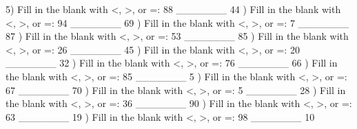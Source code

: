 \documentclass{article}%
\begin{document}
5) Fill in the blank with <, >, or =: 88 \_\_\_\_\_\_\_ 44%
\newline%
\newline%
) Fill in the blank with <, >, or =: 94 \_\_\_\_\_\_\_ 69%
\newline%
\newline%
) Fill in the blank with <, >, or =: 7 \_\_\_\_\_\_\_ 87%
\newline%
\newline%
) Fill in the blank with <, >, or =: 53 \_\_\_\_\_\_\_ 85%
\newline%
\newline%
) Fill in the blank with <, >, or =: 26 \_\_\_\_\_\_\_ 45%
\newline%
\newline%
) Fill in the blank with <, >, or =: 20 \_\_\_\_\_\_\_ 32%
\newline%
\newline%
) Fill in the blank with <, >, or =: 76 \_\_\_\_\_\_\_ 66%
\newline%
\newline%
) Fill in the blank with <, >, or =: 85 \_\_\_\_\_\_\_ 5%
\newline%
\newline%
) Fill in the blank with <, >, or =: 67 \_\_\_\_\_\_\_ 70%
\newline%
\newline%
) Fill in the blank with <, >, or =: 5 \_\_\_\_\_\_\_ 28%
\newline%
\newline%
) Fill in the blank with <, >, or =: 36 \_\_\_\_\_\_\_ 90%
\newline%
\newline%
) Fill in the blank with <, >, or =: 63 \_\_\_\_\_\_\_ 19%
\newline%
\newline%
) Fill in the blank with <, >, or =: 98 \_\_\_\_\_\_\_ 10%
\newline%
\end{document}
